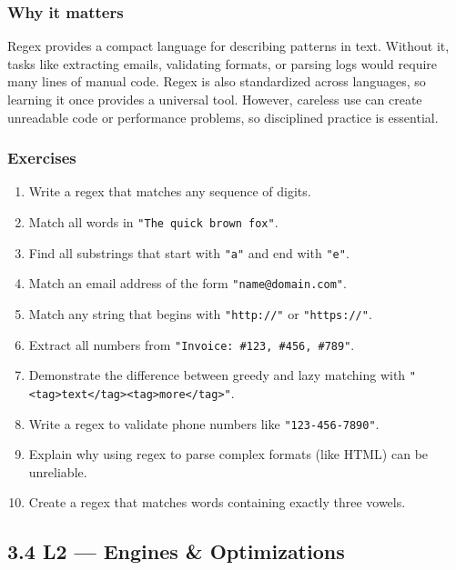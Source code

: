 \documentclass[
  letterpaper,
  DIV=11,
  numbers=noendperiod]{scrreprt}
\providecommand{\tightlist}{%
  \setlength{\itemsep}{0pt}\setlength{\parskip}{0pt}}
\begin{document}
\subsubsection{Why it matters}\label{why-it-matters-40}

Regex provides a compact language for describing patterns in text.
Without it, tasks like extracting emails, validating formats, or parsing
logs would require many lines of manual code. Regex is also standardized
across languages, so learning it once provides a universal tool.
However, careless use can create unreadable code or performance
problems, so disciplined practice is essential.

\subsubsection{Exercises}\label{exercises-39}

\begin{enumerate}
\def\labelenumi{\arabic{enumi}.}
\tightlist
\item
  Write a regex that matches any sequence of digits.
\item
  Match all words in \texttt{"The\ quick\ brown\ fox"}.
\item
  Find all substrings that start with \texttt{"a"} and end with
  \texttt{"e"}.
\item
  Match an email address of the form \texttt{"name@domain.com"}.
\item
  Match any string that begins with \texttt{"http://"} or
  \texttt{"https://"}.
\item
  Extract all numbers from \texttt{"Invoice:\ \#123,\ \#456,\ \#789"}.
\item
  Demonstrate the difference between greedy and lazy matching with
  \texttt{"\textless{}tag\textgreater{}text\textless{}/tag\textgreater{}\textless{}tag\textgreater{}more\textless{}/tag\textgreater{}"}.
\item
  Write a regex to validate phone numbers like \texttt{"123-456-7890"}.
\item
  Explain why using regex to parse complex formats (like HTML) can be
  unreliable.
\item
  Create a regex that matches words containing exactly three vowels.
\end{enumerate}

\subsection{3.4 L2 --- Engines \&
Optimizations}\label{l2-engines-optimizations}
\end{document}
